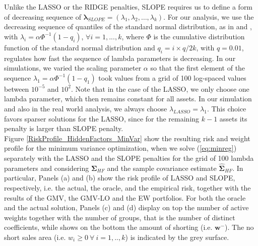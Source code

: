 \documentclass[12pt, a4paper]{article}
\newcommand{\bfw}{\boldsymbol{w} }
\newcommand{\bfSigma}{\boldsymbol{\Sigma} }
\begin{document}
Unlike the LASSO or the RIDGE penalties, SLOPE requires us to define a form of decreasing sequence of $\boldsymbol{\lambda}_{SLOPE} = (\lambda_{1},  \lambda_{2}, \ldots,  \lambda_{k})$.
For our analysis, we use the decreasing sequence of quantiles of the standard normal distribution, as in \cite{Bogdan2013} and \cite{Bogdan2015}, with $\lambda_{i} = \alpha \Phi^{-1}(1-q_{i})$, $\forall i = 1,..., k$, where $\Phi$ is the cumulative distribution function of the standard normal distribution and $q_{i} = i\times q/2k$, with $q=0.01$, regulates how fast the sequence of lambda parameters is decreasing. In our simulations, we varied the scaling parameter $\alpha$ so that the first element of the sequence $\lambda_{1} = \alpha \Phi^{-1}(1-q_{1})$ took values from a grid of 100 log-spaced values between $10^{-5}$ and $10^{2}$.  Note that in the case of the LASSO, we only choose one lambda parameter, which then remains constant for all assets. In our simulation and also in the real world analysis, we always choose $\lambda_{LASSO}=\lambda_{1}$. This choice favors sparser solutions for the LASSO, since for the remaining $k-1$ assets its penalty is larger than SLOPE penalty.\\
Figure \ref{RiskProfile_HiddenFactors_MinVar} show the resulting risk and weight profile for the minimum variance optimization, when we solve (\ref{eq:minreg}) separately with the LASSO and the SLOPE penalties for the grid of 100 lambda parameters and considering $\bfSigma_{HF}$ and the sample covariance estimate $\widehat{\bfSigma}_{HF}$. In particular, Panels (a) and (b) show the risk profile of LASSO and SLOPE, respectively, i.e. the actual, the oracle, and the empirical risk, together with the results of the GMV, the GMV-LO and the EW portfolios. For both the oracle and the actual solution, Panels (c) and (d) display on top the number of active weights together with the number of groups, that is the number of distinct coefficients, while shows on the bottom the amount of shorting (i.e. $\bfw^{-}$). The no short sales area (i.e. $w_{i} \geq 0\ \forall \ i=1,.., k$) is indicated by the grey surface.
%
\end{document}
